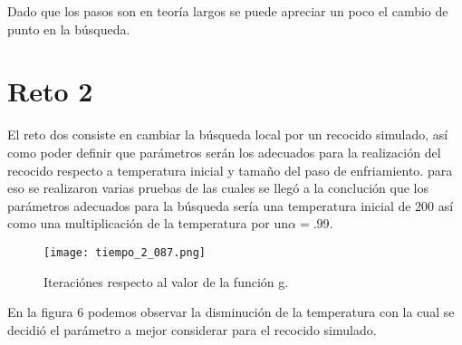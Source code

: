\documentclass[a4paper]{article}
\begin{document}
 Dado que los pasos son en teoría largos se puede apreciar un poco el cambio de punto en la búsqueda.


\section{Reto 2}
El reto dos consiste en cambiar la búsqueda local por un recocido simulado, así como poder definir que parámetros serán los adecuados para la realización del recocido respecto a temperatura inicial y tamaño del paso de enfriamiento. para eso se realizaron varias pruebas de las cuales se llegó a la conclución que los parámetros adecuados para la búsqueda sería una temperatura inicial de 200 así como una multiplicación de la temperatura por un$ \alpha = .99 $.

\begin{figure}[h!]
\centering
\texttt{[image: tiempo\_2\_087.png]}
\caption{Iteraciónes respecto al valor de la función g.}
\label{fig:tiempo_2_0}
\end{figure}

En la figura 6 podemos observar la disminución de la temperatura con la cual se decidió el parámetro a mejor considerar para el recocido simulado.
\end{document}
